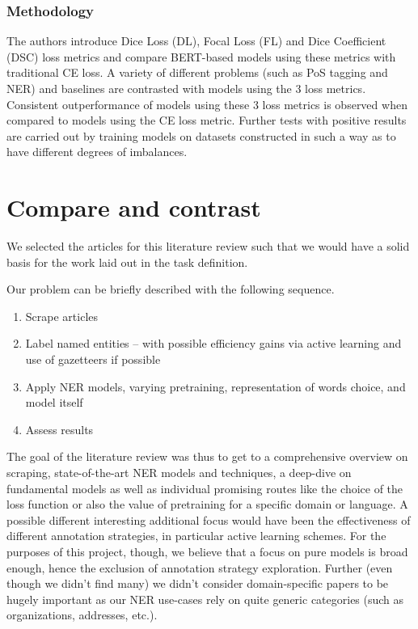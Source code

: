 \documentclass[11pt]{article}
\begin{document}
\subsubsection{Methodology}
The authors introduce Dice Loss (DL), Focal Loss (FL) and Dice Coefficient (DSC) loss metrics and compare BERT-based models using these metrics with traditional CE loss. A variety of different problems (such as PoS tagging and NER) and baselines are contrasted with models using the 3 loss metrics. Consistent outperformance of models using these 3 loss metrics is observed when compared to models using the CE loss metric. Further tests with positive results are carried out by training models on datasets constructed in such a way as to have different degrees of imbalances.


\section{Compare and contrast}

We selected the articles for this literature review such that we would have a solid basis for the work laid out in the task definition. 

Our problem can be briefly described with the following sequence. 
\begin{enumerate}
    \item Scrape articles
    \item Label named entities -- with possible efficiency gains via active learning and use of gazetteers if possible
    \item Apply NER models, varying pretraining, representation of words choice, and model itself
    \item Assess results
\end{enumerate}

The goal of the literature review was thus to get to a comprehensive overview on scraping, state-of-the-art NER models and techniques, a deep-dive on fundamental models as well as individual promising routes like the choice of the loss function or also the value of pretraining for a specific domain or language. A possible different interesting additional focus would have been the effectiveness of different annotation strategies, in particular active learning schemes. For the purposes of this project, though, we believe that a focus on pure models is broad enough, hence the exclusion of annotation strategy exploration. Further (even though we didn't find many) we didn't consider domain-specific papers to be hugely important as our NER use-cases rely on quite generic categories (such as organizations, addresses, etc.).
\end{document}
